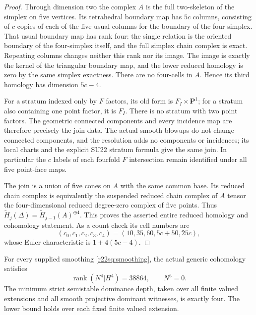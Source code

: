 \begin{proof}
Through dimension two the complex $A$ is the full
two-skeleton of the simplex on five vertices.  Its
tetrahedral boundary map has $5c$ columns, consisting of
$c$ copies of each of the five usual columns for the
boundary of the four-simplex.  That usual boundary map
has rank four: the single relation is the oriented
boundary of the four-simplex itself, and the full simplex
chain complex is exact.  Repeating columns changes neither
this rank nor its image.  The image is exactly the kernel
of the triangular boundary map, and the lower reduced
homology is zero by the same simplex exactness.  There
are no four-cells in $A$.  Hence its third homology has
dimension $5c-4$.

For a stratum indexed only by $F$ factors, its old form
is $F_I\times\mathbf P^1$; for a stratum also containing
one point factor, it is $F_I$.  There is no stratum with
two point factors.  The geometric connected components
and every incidence map are therefore precisely the join
data.  The actual smooth blowups do not change connected
components, and the resolution adds no components or
incidences; its local charts and the explicit SU22 stratum
formula give the same join.  In particular the $c$ labels
of each fourfold $F$ intersection remain identified under
all five point-face maps.

The join is a union of five cones on $A$ with the same
common base.  Its reduced chain complex is equivalently
the suspended reduced chain complex of $A$ tensor the
four-dimensional reduced degree-zero complex of five
points.  Thus
$\widetilde H_j(\Delta)=\widetilde H_{j-1}(A)^{\oplus4}$.
This proves the asserted entire reduced homology and
cohomology statement.  As a count check its cell numbers
are
\[
                (c_0,c_1,c_2,c_3,c_4)
                      =(10,35,60,5c+50,25c),
\]
whose Euler characteristic is $1+4(5c-4)$.
\end{proof}

\begin{theorem}
\label{r22sq:N4}
For every supplied smoothing \eqref{r22sq:smoothing}, the
actual generic cohomology satisfies
\[
                 \operatorname{rank}(N^4|H^4)=38864,\qquad N^5=0.
 \tag{SQ22.7}\label{r22sq:monodromy}
\]
The minimum strict semistable dominance depth, taken over
all finite valued extensions and all smooth projective
dominant witnesses, is exactly four.  The lower bound
holds over each fixed finite valued extension.
\end{theorem}


